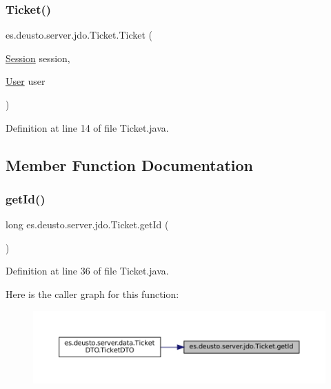 \subsubsection{\texorpdfstring{Ticket()}{Ticket()}}
{\footnotesize\ttfamily es.\+deusto.\+server.\+jdo.\+Ticket.\+Ticket (\begin{DoxyParamCaption}\item[{\mbox{\hyperlink{classes_1_1deusto_1_1server_1_1jdo_1_1_session}{Session}}}]{session,  }\item[{\mbox{\hyperlink{classes_1_1deusto_1_1server_1_1jdo_1_1_user}{User}}}]{user }\end{DoxyParamCaption})}



Definition at line 14 of file Ticket.\+java.



\subsection{Member Function Documentation}
\mbox{\label{classes_1_1deusto_1_1server_1_1jdo_1_1_ticket_a9dadf081db69123f90cfe2cb9f7c0870}} 
\subsubsection{\texorpdfstring{getId()}{getId()}}
{\footnotesize\ttfamily long es.\+deusto.\+server.\+jdo.\+Ticket.\+get\+Id (\begin{DoxyParamCaption}{ }\end{DoxyParamCaption})}



Definition at line 36 of file Ticket.\+java.

Here is the caller graph for this function\+:\nopagebreak
\begin{figure}[H]
\begin{center}
\leavevmode
\includegraphics[width=350pt]{classes_1_1deusto_1_1server_1_1jdo_1_1_ticket_a9dadf081db69123f90cfe2cb9f7c0870_icgraph}
\end{center}
\end{figure}
\mbox{\label{classes_1_1deusto_1_1server_1_1jdo_1_1_ticket_a60d6aebd66fee1d5d0ebde52540dcac9}} 
